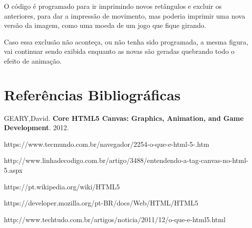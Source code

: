 \documentclass[12pt,a4paper]{article}
\begin{document}

O código é programado para ir imprimindo novos retângulos e excluir os anteriores, para dar a impressão de movimento, mas poderia imprimir uma nova versão da imagem, como uma moeda de um jogo que fique girando.




Caso essa exclusão não aconteça, ou não tenha sido programada, a mesma figura, vai continuar sendo exibida enquanto as novas são geradas quebrando todo o efeito de animação.










\section{Referências Bibliográficas}

\noindent GEARY,David. \textbf{Core HTML5 Canvas: Graphics, Animation, and Game Development}. 2012.

\noindent https://www.tecmundo.com.br/navegador/2254-o-que-e-html-5-.htm

\noindent http://www.linhadecodigo.com.br/artigo/3488/entendendo-a-tag-canvas-no-html-5.aspx

\noindent https://pt.wikipedia.org/wiki/HTML5

\noindent https://developer.mozilla.org/pt-BR/docs/Web/HTML/HTML5

\noindent http://www.techtudo.com.br/artigos/noticia/2011/12/o-que-e-html5.html
\end{document}
